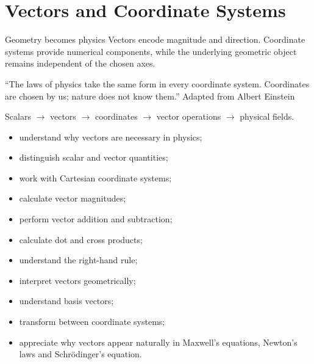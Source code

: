 \chapter{Vectors and Coordinate Systems}
\chapteropeningart
{Geometry becomes physics}
{Vectors encode magnitude and direction. Coordinate systems provide numerical
components, while the underlying geometric object remains independent of the
chosen axes.}

\chapterquote
{``The laws of physics take the same form in every coordinate system.
Coordinates are chosen by us; nature does not know them.''}
{Adapted from Albert Einstein}

\begin{roadmapbox}
Scalars $\longrightarrow$ vectors $\longrightarrow$ coordinates
$\longrightarrow$ vector operations $\longrightarrow$ physical fields.
\end{roadmapbox}

\learningobjectives


\begin{itemize}
	\item understand why vectors are necessary in physics;
	\item distinguish scalar and vector quantities;
	\item work with Cartesian coordinate systems;
	\item calculate vector magnitudes;
	\item perform vector addition and subtraction;
	\item calculate dot and cross products;
	\item understand the right-hand rule;
	\item interpret vectors geometrically;
	\item understand basis vectors;
	\item transform between coordinate systems;
	\item appreciate why vectors appear naturally in Maxwell's equations,
	Newton's laws and Schrödinger's equation.
\end{itemize}

\newpage


